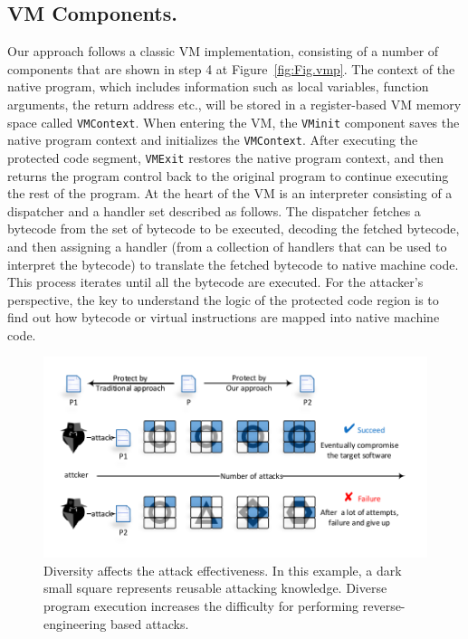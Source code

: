 \subsection{VM Components.} Our approach follows a classic VM implementation,
consisting of a number of components that are shown 
in step 4 at Figure~\ref{fig:Fig.vmp}.
The context of the native program, which includes
information such as local variables, function arguments, the return address etc.,
will be stored in a register-based VM memory space called \texttt{VMContext}. When entering the VM, the \texttt{VMinit}
component saves the native program context and initializes the
\texttt{VMContext}. After executing the protected code segment,  \texttt{VMExit} restores the
native program context, and then returns the program control back to the
original program to continue executing the rest of the program.
At the heart of the VM is an interpreter consisting of a
dispatcher and a handler set described as follows. The dispatcher fetches a
bytecode from the set of bytecode to be executed, decoding the fetched
bytecode, and then assigning a handler (from a collection of handlers that can be used
to interpret the bytecode)  to translate the fetched bytecode to native
machine code. This process iterates until all the bytecode are executed.
For the attacker's perspective, the key to understand the
logic of the protected code region is to find out how
bytecode or virtual instructions are mapped into native machine code.

\begin{figure}[t]%
    \centering
    \includegraphics[width=0.7\columnwidth]{figure/figattack.pdf}
    \caption{Diversity affects the attack effectiveness. In this example, a dark small square represents reusable attacking knowledge. Diverse program execution increases the difficulty for performing reverse-engineering based attacks.}\label{fig:Fig.attack}
\end{figure}

